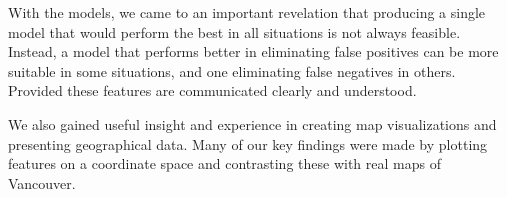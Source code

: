 With the models, we came to an important revelation that producing a single model that would perform the best in all situations is not always feasible. Instead, a model that performs better in eliminating false positives can be more suitable in some situations, and one eliminating false negatives in others. Provided these features are communicated clearly and understood.

We also gained useful insight and experience in creating map visualizations and presenting geographical data. Many of our key findings were made by plotting features on a coordinate space and contrasting these with real maps of Vancouver.


